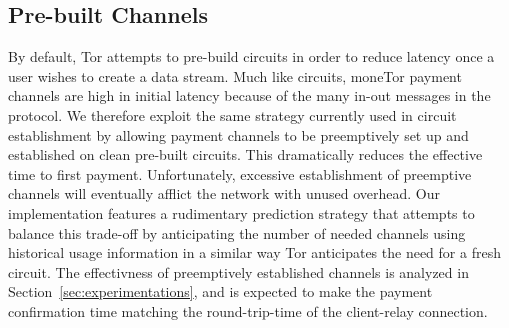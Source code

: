 
%
%

\subsection{Pre-built Channels}
By default, Tor attempts to pre-build circuits in order to reduce latency once a
user wishes to create a data stream. Much like circuits, moneTor payment
channels are high in initial latency because of the many in-out messages in the protocol. We therefore exploit the same strategy currently used in circuit establishment by
allowing payment channels to be preemptively set up and established on clean
pre-built circuits. This dramatically reduces the effective time to first
payment. Unfortunately, excessive establishment of preemptive channels will
eventually afflict the network with unused overhead. Our implementation features
a rudimentary prediction strategy that attempts to balance this trade-off by
anticipating the number of needed channels using historical usage
information in a similar way Tor anticipates the need for a fresh circuit. The effectivness of preemptively established channels is analyzed in Section~\ref{sec:experimentations}, and is expected to make the payment confirmation time matching the round-trip-time of the client-relay connection.

